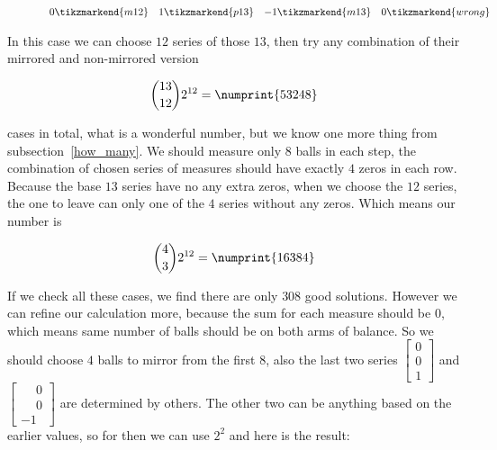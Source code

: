 \documentclass[11pt]{article} %
\begin{document}
\begin{figure}[h]
\[\begin{array}{rrrrrrrrr}
 0 \tikzmarkend{m12} &
 1 \tikzmarkend{p13} &
-1 \tikzmarkend{m13} &
 0 \tikzmarkend{wrong} 
\end{array}
\]
\end{figure}

In this case we can choose $12$ series of those $13$, then try any combination of their mirrored and non-mirrored version

\[ \binom{13}{12} 2^{12} = \numprint{53248} \]

cases in total, what is a wonderful number, but we know one more thing from subsection~\ref{how_many}. We should measure only $8$ balls in each step, the combination of chosen series of measures should have exactly $4$ zeros in each row. Because the base $13$ series have no any extra zeros, when we choose the $12$ series, the one to leave can only one of the $4$ series without any zeros. Which means our number is

\[ \binom{4}{3} 2^{12} = \numprint{16384} \]

If we check all these cases, we find there are only $308$ good solutions. However we can refine our calculation more, because the sum for each measure should be $0$, which means same number of balls should be on both arms of balance. So we should choose $4$ balls to mirror from the first $8$, also the last two series $\left[\begin{smallmatrix}0\\0\\1\end{smallmatrix}\right]$ and $\left[\begin{smallmatrix}\phantom{{}-{}}0\\\phantom{{}-{}}0\\-1\end{smallmatrix}\right]$ are determined by others. The other two can be anything based on the earlier values, so for then we can use $2^2$ and here is the result:
\end{document}
